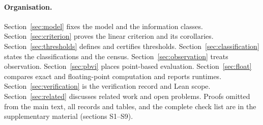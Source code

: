\paragraph{Organisation.}
Section~\ref{sec:model} fixes the model and the information classes. Section~\ref{sec:criterion} proves the linear criterion and its corollaries. Section~\ref{sec:thresholds} defines and certifies thresholds. Section~\ref{sec:classification} states the classifications and the census. Section~\ref{sec:observation} treats observation. Section~\ref{sec:pbvi} places point-based evaluation. Section~\ref{sec:float} compares exact and floating-point computation and reports runtimes. Section~\ref{sec:verification} is the verification record and Lean scope. Section~\ref{sec:related} discusses related work and open problems. Proofs omitted from the main text, all records and tables, and the complete check list are in the supplementary material (sections S1--S9).

